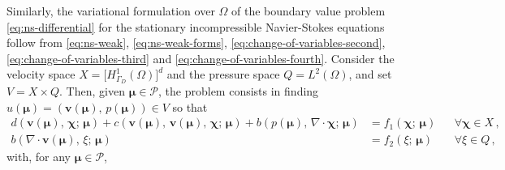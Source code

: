 \documentclass[12pt, a4paper, twoside, openright]{report}
\numberwithin{equation}{chapter}
\theoremstyle{theorem}
\theoremstyle{definition}
\theoremstyle{remark}
\theoremstyle{proposition}
\numberwithin{figure}{chapter}
\newcommand{\bg}[1]{\boldsymbol{#1}}
\begin{document}
		Similarly, the variational formulation over $\Omega$ of the boundary value problem \eqref{eq:ns-differential} for the stationary incompressible Navier-Stokes equations follow from \eqref{eq:ns-weak}, \eqref{eq:ns-weak-forms}, \eqref{eq:change-of-variables-second}, \eqref{eq:change-of-variables-third} and \eqref{eq:change-of-variables-fourth}. Consider the velocity space $X = \big[ H_{\Gamma_D}^1(\Omega) \big]^d$ and the pressure space $Q = L^2(\Omega)$, and set $V = X \times Q$. Then, given $\bg{\mu} \in \mathcal{P}$, the problem consists in finding $u(\bg{\mu}) = (\bg{v}(\bg{\mu}), \, p(\bg{\mu})) \in V$ so that
		\begin{subequations}
			\label{eq:ns-weak-reference}
			\begin{align}
				d(\bg{v}(\bg{\mu}), \, \bg{\chi}; \, \bg{\mu}) + c(\bg{v}(\bg{\mu}), \, \bg{v}(\bg{\mu}), \, \bg{\chi}; \, \bg{\mu}) + b(p(\bg{\mu}), \, \nabla \cdot \bg{\chi}; \, \bg{\mu}) & = f_1(\bg{\chi}; \, \bg{\mu}) && \forall \bg{\chi} \in X \, , \\
				b(\nabla \cdot \bg{v}(\bg{\mu}), \, \xi; \, \bg{\mu}) & = f_2(\xi; \, \bg{\mu}) && \forall \xi \in Q \, ,
			\end{align}
		\end{subequations}
		with, for any $\bg{\mu} \in \mathcal{P}$,
\end{document}
